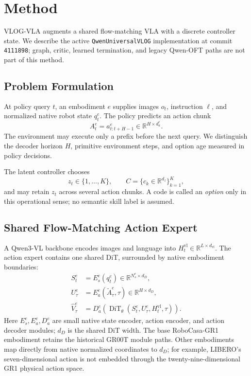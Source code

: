 \section{Method}

VLOG-VLA augments a shared flow-matching VLA with a discrete controller state.
We describe the active \texttt{QwenUniversalVLOG} implementation at commit
\texttt{4111898}; graph, critic, learned termination, and legacy Qwen-OFT paths
are not part of this method.

\subsection{Problem Formulation}

At policy query \(t\), an embodiment \(e\) supplies images \(o_t\), instruction
\(\ell\), and normalized native robot state \(q_t^e\).  The policy predicts an
action chunk
\begin{equation}
    A_t^e=a^e_{t:t+H-1}\in\mathbb{R}^{H\times d_a^e}.
    \label{eq:action-chunk}
\end{equation}
The environment may execute only a prefix before the next query.  We distinguish
the decoder horizon \(H\), primitive environment steps, and option age measured
in policy decisions.

The latent controller chooses
\begin{equation}
    z_t\in\{1,\ldots,K\},\qquad
    C=\{c_k\in\mathbb{R}^{d_z}\}_{k=1}^{K},
    \label{eq:option-space}
\end{equation}
and may retain \(z_t\) across several action chunks.  A code is called an
\emph{option} only in this operational sense; no semantic skill label is
assumed.



\subsection{Shared Flow-Matching Action Expert}

A Qwen3-VL backbone encodes images and language into
\(H_t^{\mathrm{vl}}\in\mathbb{R}^{L\times d_{\mathrm{vl}}}\).  The action
expert contains one shared DiT, surrounded by native embodiment boundaries:
\begin{align}
    S_t^e &= E_s^e(q_t^e)\in\mathbb{R}^{N_s^e\times d_D},\\
    U_\tau^e &= E_a^e(\widetilde A_\tau^e,\tau)
        \in\mathbb{R}^{H\times d_D},\\
    \widehat V_\tau^e &= D_a^e\!\left(
        \operatorname{DiT}_{\theta}
        (S_t^e,U_\tau^e,H_t^{\mathrm{vl}},\tau)\right).
    \label{eq:native-boundaries}
\end{align}
Here \(E_s^e,E_a^e,D_a^e\) are small native state encoder, action encoder,
and action decoder modules; \(d_D\) is the shared DiT width.  The base
RoboCasa-GR1 embodiment retains the historical GR00T module paths.  Other
embodiments map directly from native normalized coordinates to \(d_D\); for
example, LIBERO's seven-dimensional action is not embedded through the
twenty-nine-dimensional GR1 physical action space.

